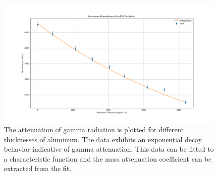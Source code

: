 \begin{figure}
\centering
\includegraphics[width=\textwidth]{Al.png}
\caption{The attenuation of gamma radiation is plotted for different thicknesses of aluminum. The data exhibits an exponential decay behavior indicative of gamma attenuation. This data can be fitted to a characteristic function and the mass attenuation coefficient can be extracted from the fit.}
\label{fig:Al}
\end{figure}
